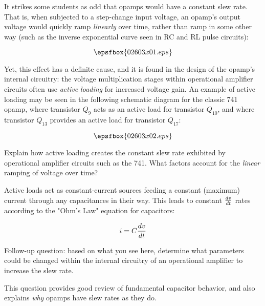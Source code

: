 

It strikes some students as odd that opamps would have a constant slew rate.  That is, when subjected to a step-change input voltage, an opamp's output voltage would quickly ramp {\it linearly} over time, rather than ramp in some other way (such as the inverse exponential curve seen in RC and RL pulse circuits):

$$\epsfbox{02603x01.eps}$$

Yet, this effect has a definite cause, and it is found in the design of the opamp's internal circuitry: the voltage multiplication stages within operational amplifier circuits often use {\it active loading} for increased voltage gain.  An example of active loading may be seen in the following schematic diagram for the classic 741 opamp, where transistor $Q_9$ acts as an active load for transistor $Q_{10}$, and where transistor $Q_{13}$ provides an active load for transistor $Q_{17}$:

$$\epsfbox{02603x02.eps}$$

Explain how active loading creates the constant slew rate exhibited by operational amplifier circuits such as the 741.  What factors account for the {\it linear} ramping of voltage over time?







Active loads act as constant-current sources feeding a constant (maximum) current through any capacitances in their way.  This leads to constant ${dv \over dt}$ rates according to the "Ohm's Law" equation for capacitors:

$$i = C {dv \over dt}$$

\vskip 10pt

Follow-up question: based on what you see here, determine what parameters could be changed within the internal circuitry of an operational amplifier to increase the slew rate.







This question provides good review of fundamental capacitor behavior, and also explains {\it why} opamps have slew rates as they do.




